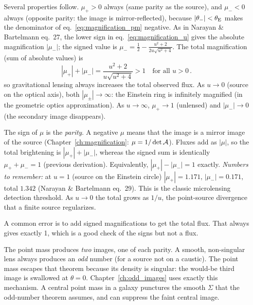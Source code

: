 Several properties follow.  $\mu_+ > 0$ always (same parity as the
source), and $\mu_- < 0$ always (opposite parity: the image is
mirror-reflected), because $|\theta_-| < \theta_{\mathrm{E}}$ makes the
denominator of eq.~\eqref{eq:magnification_pm} negative.  As in
Narayan \& Bartelmann eq.~27, the lower sign in
eq.~\eqref{eq:magnification_u} gives the absolute
magnification $|\mu_-|$; the signed value is
$\mu_- = \frac{1}{2} - \frac{u^2+2}{2u\sqrt{u^2+4}}$.
The total magnification (sum of absolute values) is
\begin{equation}
    |\mu_+| + |\mu_-| = \frac{u^2 + 2}{u\sqrt{u^2 + 4}} > 1
    \quad \text{for all } u > 0 \,.
    \label{eq:total_magnification}
\end{equation}
so gravitational lensing always increases the total observed flux.
As $u \to 0$ (source on the optical axis), both $|\mu_\pm| \to \infty$:
the Einstein ring is infinitely magnified (in the geometric optics
approximation).  As $u \to \infty$, $\mu_+ \to 1$ (unlensed) and
$|\mu_-| \to 0$ (the secondary image disappears).
\begin{annotation}
The sign of $\mu$ is the \emph{parity}. A negative $\mu$ means that the image is a
mirror image of the source (Chapter~\ref{ch:magnification}: $\mu = 1/\det\mathcal{A}$).
Fluxes add as $|\mu|$, so the total brightening is $|\mu_+| + |\mu_-|$, whereas
the signed sum is identically $\mu_+ + \mu_- = 1$ (previous derivation).
Equivalently, $|\mu_+| - |\mu_-| = 1$ exactly.
\emph{Numbers to remember:} at $u = 1$ (source on the Einstein circle)
$|\mu_+| = 1.171$, $|\mu_-| = 0.171$, total $1.342$ (Narayan \& Bartelmann
eq.~29). This is the classic microlensing detection threshold. As $u \to 0$ the
total grows as $1/u$, the point-source divergence that a finite source
regularizes.

A common error is to add signed magnifications to get the total flux.
That always gives exactly 1, which is a good check of the signs but not a flux.
\end{annotation}
\begin{bridge}
The point mass produces \emph{two} images, one of each parity. A smooth,
non-singular lens always produces an \emph{odd} number (for a source not on
a caustic). The point mass
escapes that theorem because its density is singular: the would-be third
image is swallowed at $\theta = 0$. Chapter~\ref{ch:odd_images} uses exactly
this mechanism. A central point mass in a galaxy punctures the smooth
$\Sigma$ that the odd-number theorem assumes, and can suppress the faint
central image.
\end{bridge}


